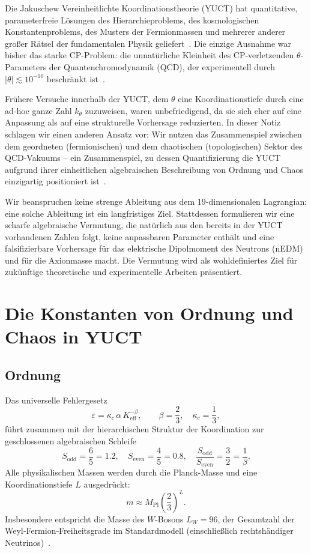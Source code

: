 \documentclass[12pt,a4paper]{article}
\begin{document}
	Die Jakuschew Vereinheitlichte Koordinationstheorie (YUCT) hat quantitative, parameterfreie Lösungen des Hierarchieproblems, des kosmologischen Konstantenproblems, des Musters der Fermionmassen und mehrerer anderer großer Rätsel der fundamentalen Physik geliefert~\cite{Y1,Y3,Y4}. Die einzige Ausnahme war bisher das starke CP-Problem: die unnatürliche Kleinheit des CP‑verletzenden \(\theta\)-Parameters der Quantenchromodynamik (QCD), der experimentell durch \(|\theta| \lesssim 10^{-10}\) beschränkt ist~\cite{nEDM2020}.
	
	Frühere Versuche innerhalb der YUCT, dem \(\theta\) eine Koordinationstiefe durch eine ad‑hoc ganze Zahl \(k_\theta\) zuzuweisen, waren unbefriedigend, da sie sich eher auf eine Anpassung als auf eine strukturelle Vorhersage reduzierten. In dieser Notiz schlagen wir einen anderen Ansatz vor: Wir nutzen das Zusammenspiel zwischen dem geordneten (fermionischen) und dem chaotischen (topologischen) Sektor des QCD‑Vakuums – ein Zusammenspiel, zu dessen Quantifizierung die YUCT aufgrund ihrer einheitlichen algebraischen Beschreibung von Ordnung und Chaos einzigartig positioniert ist~\cite{Y2,Feig}.
	
	Wir beanspruchen keine strenge Ableitung aus dem 19‑dimensionalen Lagrangian; eine solche Ableitung ist ein langfristiges Ziel. Stattdessen formulieren wir eine scharfe algebraische Vermutung, die natürlich aus den bereits in der YUCT vorhandenen Zahlen folgt, keine anpassbaren Parameter enthält und eine falsifizierbare Vorhersage für das elektrische Dipolmoment des Neutrons (nEDM) und für die Axionmasse macht. Die Vermutung wird als wohldefiniertes Ziel für zukünftige theoretische und experimentelle Arbeiten präsentiert.
	
	\section{Die Konstanten von Ordnung und Chaos in YUCT}
	\label{sec:oc}
	
	\subsection{Ordnung}
	Das universelle Fehlergesetz
	\[
	\varepsilon = \kappa_c\,\alpha\,K_{\mathrm{eff}}^{-\beta},\qquad \beta = \frac{2}{3},\quad \kappa_c = \frac{1}{3},
	\]
	führt zusammen mit der hierarchischen Struktur der Koordination zur geschlossenen algebraischen Schleife
	\[
	S_{\mathrm{odd}} = \frac{6}{5} = 1.2,\quad S_{\mathrm{even}} = \frac{4}{5} = 0.8,\quad 
	\frac{S_{\mathrm{odd}}}{S_{\mathrm{even}}} = \frac{3}{2} = \frac{1}{\beta}.
	\]
	Alle physikalischen Massen werden durch die Planck-Masse und eine Koordinationstiefe \(L\) ausgedrückt:
	\[
	m \approx M_{\mathrm{Pl}}\left(\frac{2}{3}\right)^L.
	\]
	Insbesondere entspricht die Masse des \(W\)-Bosons \(L_W = 96\), der Gesamtzahl der Weyl‑Fermion‑Freiheitsgrade im Standardmodell (einschließlich rechtshändiger Neutrinos)~\cite{Y3}.
	
\end{document}
